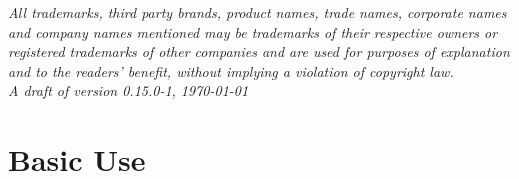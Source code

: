 \documentclass[12pt,fleqn]{book} %
\begin{document}
\small{\noindent \textit{All trademarks, third party brands, product names, trade names,
corporate names and company names mentioned may be trademarks of their
respective owners or registered trademarks of other companies and are
used for purposes of explanation and to the readers' benefit, without
implying a violation of copyright law.}}\\


\noindent \textit{A draft of version 0.15.0-1, \today} %



\pagestyle{empty} %

\tableofcontents %

\cleardoublepage %

\pagestyle{fancy} %



\part{Basic Use}







\end{document}
